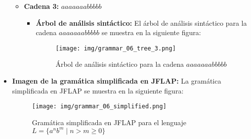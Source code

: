 \documentclass[11pt]{report}
\begin{document}
\begin{itemize}
\begin{itemize}
\begin{itemize}
\begin{figure}[H]
        \label{fig:arbol17}
      \end{figure}
    \end{itemize}
    \item \textbf{Cadena 3:} $aaaaaaabbbbb$
    \begin{itemize}
      \item \textbf{Árbol de análisis sintáctico:} El árbol de análisis sintáctico para la cadena $aaaaaaabbbbb$ se muestra en la siguiente figura:
      \begin{figure}[H]
        \centering
        \texttt{[image: img/grammar\_06\_tree\_3.png]}
        \caption{Árbol de análisis sintáctico para la cadena $aaaaaaabbbbb$}
        \label{fig:arbol18}
      \end{figure}
    \end{itemize}
  \end{itemize}
  \item \textbf{Imagen de la gramática simplificada en JFLAP:} La gramática simplificada en JFLAP se muestra en la siguiente figura:
  \begin{figure}[H]
    \centering
    \texttt{[image: img/grammar\_06\_simplified.png]}
    \caption{Gramática simplificada en JFLAP para el lenguaje $L = \{a^n b^m \mid n > m \geq 0\}$}
    \label{fig:gramatica6_simplified}
  \end{figure}
\end{itemize}

\newpage

\end{document}
